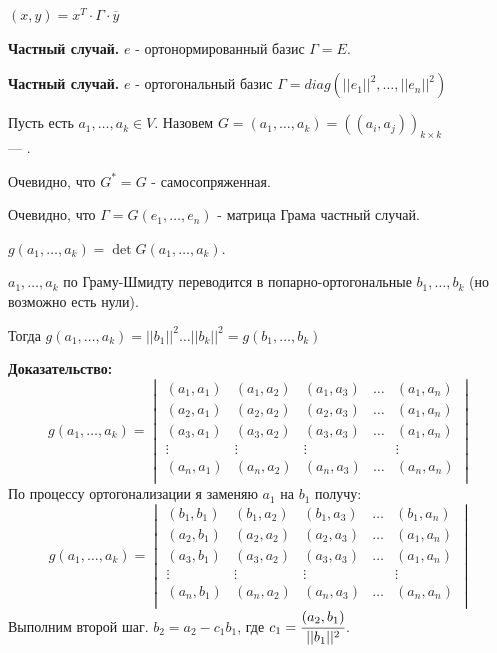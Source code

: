 $(x,y)   = x^T \cdot \Gamma \cdot \overline{y}$

\textbf{Частный случай.} $e$ - ортонормированный базис $\Gamma = E$.

\textbf{Частный случай.} $e$ - ортогональный базис $\Gamma = diag(||e_1||^2,\ldots,||e_n||^2)$

 Пусть есть $a_1,\ldots, a_k\in V$. Назовем $G = (a_1,\ldots,a_k) =((a_i,a_j))_{k\times k}$ \\--- .

Очевидно, что $G^* = G$ - самосопряженная.

Очевидно, что $\Gamma = G(e_1,\ldots, e_n)$ - матрица Грама частный случай.

 $g(a_1,\ldots, a_k) = \det G(a_1,\ldots, a_k)$.


$a_1,\ldots, a_k$ по Граму-Шмидту переводится в попарно-ортогональные $b_1,\ldots,b_k$ (но возможно есть нули).

Тогда $g(a_1,\ldots, a_k) = ||b_1||^2\ldots ||b_k||^2 = g(b_1,\ldots,b_k)$

\textbf{Доказательство:}
$$g(a_1,\ldots, a_k) = \begin{vmatrix}
    (a_1,a_1) & (a_1, a_2) & (a_1,a_3) & \ldots & (a_1,a_n)\\
     (a_2,a_1) & (a_2, a_2) & (a_2,a_3) & \ldots & (a_1,a_n)\\
      (a_3,a_1) & (a_3, a_2) & (a_3,a_3) & \ldots & (a_1,a_n)\\
      \vdots & \vdots & \vdots & & \vdots \\
       (a_n,a_1) & (a_n, a_2) & (a_n,a_3) & \ldots & (a_n,a_n)\\
\end{vmatrix}$$
По процессу ортогонализации я заменяю $a_1$ на $b_1$ получу:
$$g(a_1,\ldots, a_k) = \begin{vmatrix}
    (b_1,b_1) & (b_1, a_2) & (b_1,a_3) & \ldots & (b_1,a_n)\\
     (a_2,b_1) & (a_2, a_2) & (a_2,a_3) & \ldots & (a_1,a_n)\\
      (a_3,b_1) & (a_3, a_2) & (a_3,a_3) & \ldots & (a_1,a_n)\\
      \vdots & \vdots & \vdots & & \vdots \\
       (a_n,b_1) & (a_n, a_2) & (a_n,a_3) & \ldots & (a_n,a_n)\\
\end{vmatrix}$$
Выполним второй шаг. $b_2 = a_2 -c_1b_1$, где $c_1 = \cfrac{(a_2,b_1)}{||b_1||^2}$.

